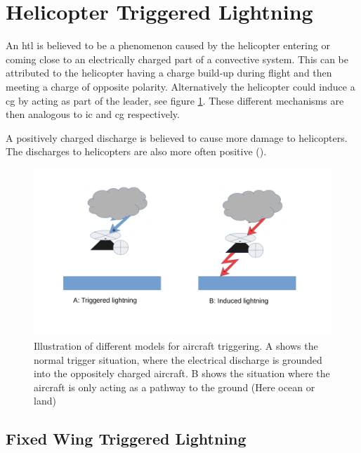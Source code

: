 \section{Helicopter Triggered Lightning}
An \acrshort{htl} is believed to be a phenomenon caused by the helicopter entering or coming close to an electrically charged part of a convective system. This can be attributed to the helicopter having a charge build-up during flight and then meeting a charge of opposite polarity. Alternatively the helicopter could induce a \acrshort{cg} by acting as part of the leader, see figure \ref{fig:triggertyper}. These different mechanisms are then analogous to \acrshort{ic} and \acrshort{cg} respectively. 

A positively charged discharge is believed to cause more damage to helicopters. The discharges to helicopters are also more often positive  (\cite{hardwick}).

\begin{figure}
    \centering
    \includegraphics[width=\textwidth]{Figures/triggertyper.pdf}
    \caption{Illustration of different models for aircraft triggering. A shows the normal trigger situation, where the electrical discharge is grounded into the oppositely charged aircraft. B shows the situation where the aircraft is only acting as a pathway to the ground (Here ocean or land)}
    \label{fig:triggertyper}
\end{figure}

\subsection{Fixed Wing Triggered Lightning}

